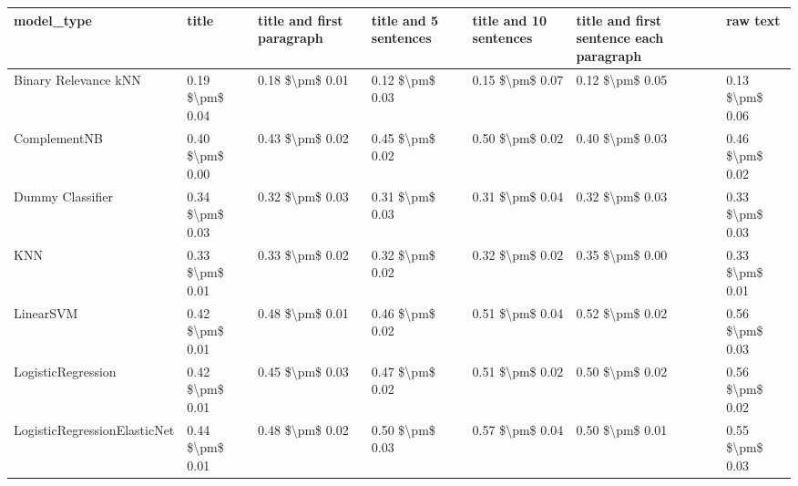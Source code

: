 \begin{tabular}{lllllll}
\toprule
                     model\_type &           title & title and first paragraph & title and 5 sentences & title and 10 sentences & title and first sentence each paragraph &            raw text \\
\midrule
           Binary Relevance kNN & 0.19 \$\textbackslash pm\$ 0.04 &           0.18 \$\textbackslash pm\$ 0.01 &       0.12 \$\textbackslash pm\$ 0.03 &        0.15 \$\textbackslash pm\$ 0.07 &                         0.12 \$\textbackslash pm\$ 0.05 &     0.13 \$\textbackslash pm\$ 0.06 \\
                   ComplementNB & 0.40 \$\textbackslash pm\$ 0.00 &           0.43 \$\textbackslash pm\$ 0.02 &       0.45 \$\textbackslash pm\$ 0.02 &        0.50 \$\textbackslash pm\$ 0.02 &                         0.40 \$\textbackslash pm\$ 0.03 &     0.46 \$\textbackslash pm\$ 0.02 \\
               Dummy Classifier & 0.34 \$\textbackslash pm\$ 0.03 &           0.32 \$\textbackslash pm\$ 0.03 &       0.31 \$\textbackslash pm\$ 0.03 &        0.31 \$\textbackslash pm\$ 0.04 &                         0.32 \$\textbackslash pm\$ 0.03 &     0.33 \$\textbackslash pm\$ 0.03 \\
                            KNN & 0.33 \$\textbackslash pm\$ 0.01 &           0.33 \$\textbackslash pm\$ 0.02 &       0.32 \$\textbackslash pm\$ 0.02 &        0.32 \$\textbackslash pm\$ 0.02 &                         0.35 \$\textbackslash pm\$ 0.00 &     0.33 \$\textbackslash pm\$ 0.01 \\
                      LinearSVM & 0.42 \$\textbackslash pm\$ 0.01 &           0.48 \$\textbackslash pm\$ 0.01 &       0.46 \$\textbackslash pm\$ 0.02 &        0.51 \$\textbackslash pm\$ 0.04 &                         0.52 \$\textbackslash pm\$ 0.02 &     0.56 \$\textbackslash pm\$ 0.03 \\
             LogisticRegression & 0.42 \$\textbackslash pm\$ 0.01 &           0.45 \$\textbackslash pm\$ 0.03 &       0.47 \$\textbackslash pm\$ 0.02 &        0.51 \$\textbackslash pm\$ 0.02 &                         0.50 \$\textbackslash pm\$ 0.02 &     0.56 \$\textbackslash pm\$ 0.02 \\
   LogisticRegressionElasticNet & 0.44 \$\textbackslash pm\$ 0.01 &           0.48 \$\textbackslash pm\$ 0.02 &       0.50 \$\textbackslash pm\$ 0.03 &        0.57 \$\textbackslash pm\$ 0.04 &                         0.50 \$\textbackslash pm\$ 0.01 &     0.55 \$\textbackslash pm\$ 0.03 \\

\end{tabular}
